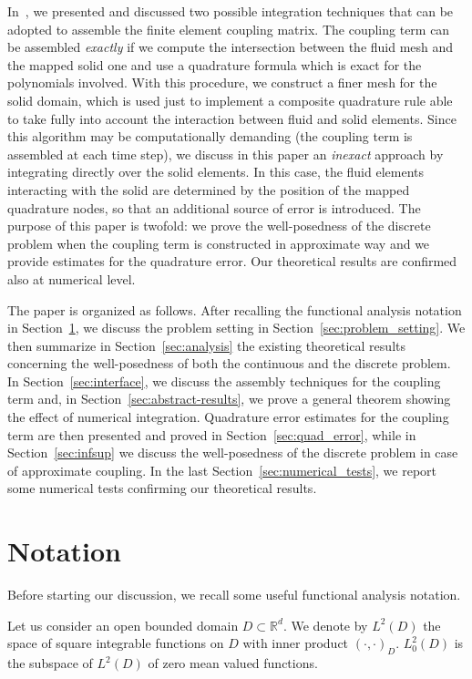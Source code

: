 \documentclass[oneside]{amsart} %
\newcommand{\numberset}{\mathbb}
\newcommand{\R}{\numberset{R}}
\begin{document}
	In~\cite{boffi2022interface}, we presented and discussed two possible integration techniques that can be adopted to assemble the finite element coupling matrix. The coupling term can be assembled \textit{exactly} if we  compute the intersection between the fluid mesh and the mapped solid one and use a quadrature formula which is exact for the polynomials involved. With this procedure, we construct a finer mesh for the solid domain, which is used just to implement a composite quadrature rule able to take fully into account the interaction between fluid and solid elements. Since this algorithm may be computationally demanding (the coupling term is assembled at each time step), we discuss in this paper an \textit{inexact} approach by integrating directly over the solid elements.
	In this case, the fluid elements interacting with the solid are determined by the position of the mapped quadrature nodes, so that an additional source of error is introduced. The purpose of this paper is twofold: we prove the well-posedness of the discrete problem when the coupling term is constructed in approximate way and we provide estimates for the quadrature error. Our theoretical results are confirmed also at numerical level.
	
	The paper is organized as follows. After recalling the functional analysis notation in Section~\ref{sec:notation}, we discuss the problem setting in Section~\ref{sec:problem_setting}. We then summarize in Section~\ref{sec:analysis} the existing theoretical results concerning the well-posedness of both the continuous and the discrete problem. In Section~\ref{sec:interface}, we discuss the assembly techniques for the coupling term and, in Section~\ref{sec:abstract-results}, we prove a general theorem showing the effect of numerical integration. Quadrature error estimates for the coupling term are then presented and proved in Section~\ref{sec:quad_error}, while in Section~\ref{sec:infsup} we discuss the well-posedness of the discrete problem in case of approximate coupling. In the last Section~\ref{sec:numerical_tests}, we report some numerical tests confirming our theoretical results.
	
	\section{Notation}\label{sec:notation}
	Before starting our discussion, we recall some useful functional analysis notation.
	
	Let us consider an open bounded domain $D\subset\R^d$. We denote by $L^2(D)$ the space of square integrable functions on $D$ with inner product $(\cdot,\cdot)_D$. $L^2_0(D)$ is the subspace of $L^2(D)$ of zero mean valued functions.
	
\end{document}
